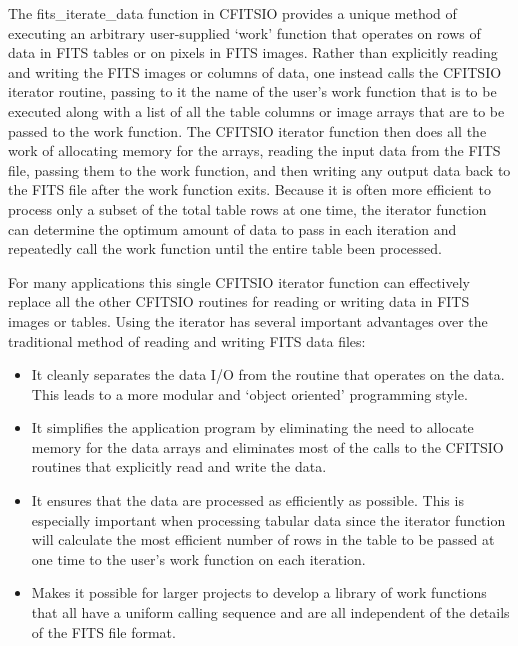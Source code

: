 \documentclass[11pt]{book}
\begin{document}
The fits\_iterate\_data function in CFITSIO provides a unique method of
executing an arbitrary user-supplied `work' function that operates on
rows of data in  FITS tables or on pixels in FITS images.  Rather than
explicitly reading and writing the FITS images or columns of data, one
instead calls the CFITSIO iterator routine, passing to it the name of
the user's work function that is to be executed along with a list of
all the table columns or image arrays that are to be passed to the work
function.  The CFITSIO iterator function then does all the work of
allocating memory for the arrays, reading the input data from the FITS
file, passing them to the work function, and then writing any output
data back to the FITS file after the work function exits.  Because
it is often more efficient to process only a subset of the total table
rows at one time, the iterator function can determine the optimum
amount of data to pass in each iteration and repeatedly call the work
function until the entire table been processed.

For many applications this single CFITSIO iterator function can
effectively replace all the other CFITSIO routines for reading or
writing data in FITS images or tables.  Using the iterator has several
important advantages over the traditional method of reading and writing
FITS data files:

\begin{itemize}
\item
It cleanly separates the data I/O from the routine that operates on
the data.  This leads to a more modular and `object oriented'
programming style.

\item
It simplifies the application program by eliminating the need to allocate
memory for the data arrays and eliminates most of the calls to the CFITSIO
routines that explicitly read and write the data.

\item
It ensures that the data are processed as efficiently as possible.
This is especially important when processing tabular data since
the iterator function will calculate the most efficient number
of rows in the table to be passed at one time to the user's work
function on each iteration.

\item
Makes it possible for larger projects to develop a library of work
functions that all have a uniform calling sequence and are all
independent of the details of the FITS file format.

\end{itemize}
\end{document}
